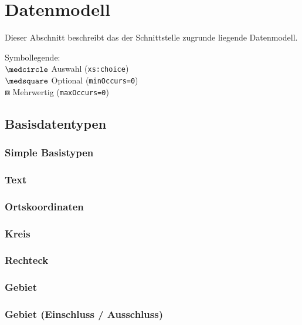 \chapter{Datenmodell}
\label{sec:Datenmodell}
Dieser Abschnitt beschreibt das der Schnittstelle zugrunde liegende Datenmodell. \medskip

\noindent Symbollegende:\\
$\medcircle$ Auswahl (\verb|xs:choice|)\\
$\medsquare$ Optional (\verb|minOccurs=0|)\\
$\boxbox$ Mehrwertig (\verb|maxOccurs=0|)\\


\section{Basisdatentypen}
\label{subsec:Datenmodell:Basis}

\subsection*{Simple Basistypen}



\subsection*{Text}


\subsection*{Ortskoordinaten}


\subsection*{Kreis}


\subsection*{Rechteck}


\subsection*{Gebiet}


\subsection*{Gebiet (Einschluss / Ausschluss)}


